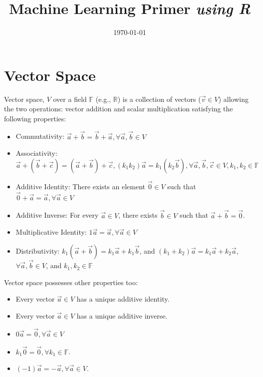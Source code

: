 \documentclass[conference,final,11pt,technote,onecolumn]{IEEEtran}\usepackage[]{graphicx}\usepackage[]{color}
\begin{document}
	
	\title{ \LARGE{Machine Learning Primer \emph{using R}}}
	\author{
  		\IEEEauthorblockA{}
	}
	\date{\today}
	\maketitle


	\section{Vector Space}
	\label{term:vector_space}
Vector space, $V$ over a field $\mathbb{F}$ (e.g., $\mathbb{R}$) is a collection of vectors ($\vec v\in V$) allowing the two operations: vector addition and scalar multiplication satisfying the following properties:
\begin{itemize}
\item Commutativity: $\vec a + \vec b = \vec b + \vec a, \forall \vec a, \vec b\in V$
\item Associativity: $\vec a + (\vec b + \vec c) = (\vec a + \vec b) + \vec c, (k_1k_2)\vec a = k_1(k_2\vec b), \forall \vec a, \vec b, \vec c \in V, k_1,k_2\in \mathbb{F}$
\item Additive Identity: There exists an element $\vec 0\in V$ such that $\vec 0 + \vec a = \vec a, \forall \vec a\in V$
\item Additive Inverse: For every $\vec a\in V$, there exists $\vec b\in V$ such that $\vec a + \vec b = \vec 0$.
\item Multiplicative Identity: $1\vec a = \vec a, \forall \vec a\in V$
\item Distributivity: $k_1(\vec a + \vec b) = k_1\vec a + k_1\vec b$, and $(k_1 + k_2)\vec a = k_1\vec a + k_2\vec a$, $ \forall \vec a, \vec b\in V$, and $k_1, k_2\in \mathbb{F}$
\end{itemize}

Vector space possesses other properties too:
\begin{itemize}
\item Every vector $\vec a\in V$ has a unique additive identity.
\item Every vector $\vec a\in V$ has a unique additive inverse.
\item $0\vec a = \vec 0, \forall \vec a \in V$
\item $k_1\vec 0 = \vec 0, \forall k_1\in \mathbb{F}$.
\item $(-1)\vec a = -\vec a, \forall \vec a \in V$.
\end{itemize}
\end{document}
